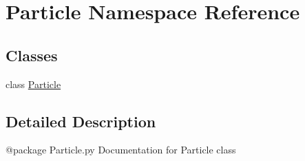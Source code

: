 \hypertarget{namespaceParticle}{\section{Particle Namespace Reference}
\label{namespaceParticle}
}
\subsection*{Classes}
\begin{DoxyCompactItemize}
\item 
class \hyperlink{classParticle_1_1Particle}{Particle}
\end{DoxyCompactItemize}


\subsection{Detailed Description}
\begin{DoxyVerb}@package Particle.py
Documentation for Particle class
\end{DoxyVerb}
 